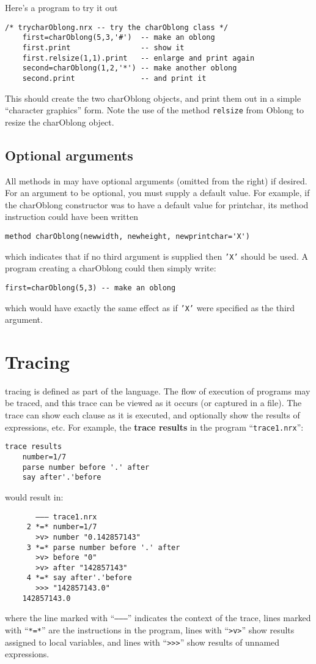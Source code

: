 Here’s a program to try it out
\begin{lstlisting}[label=trycharoblong,caption=tryCharOblong.nrx]
    /* trycharOblong.nrx -- try the charOblong class */
    first=charOblong(5,3,'#')  -- make an oblong
    first.print                -- show it
    first.relsize(1,1).print   -- enlarge and print again
    second=charOblong(1,2,'*') -- make another oblong
    second.print               -- and print it
\end{lstlisting}
This should create the two charOblong objects, and print them out in a simple “character graphics” form. Note the use of the method \texttt{relsize} from Oblong to resize the charOblong object.
\subsection{Optional arguments}
All methods in \nr{} may have optional arguments (omitted from the
right) if desired. For an argument to be optional, you must supply a
default value. For example, if the charOblong constructor was to have
a default value for printchar, its method instruction could have been
written
\begin{lstlisting}[label=default,caption=Default value X]
method charOblong(newwidth, newheight, newprintchar='X')
\end{lstlisting}
which indicates that if no third argument is supplied then \texttt{'X'} should be used. A program
creating a charOblong could then simply write:
\begin{lstlisting}[label=default,caption=Default value]
first=charOblong(5,3) -- make an oblong
\end{lstlisting}
which would have exactly the same effect as if \texttt{'X'} were specified as
the third argument.


\section{Tracing}
\nr{} tracing is defined as part of the language. The flow of
execution of programs may be traced, and this trace can be viewed as
it occurs (or captured in a file). The trace can show each clause as
it is executed, and optionally show the results of expressions,
etc. For example, the \textbf{trace results} in the program “\texttt{trace1.nrx}”:
\begin{lstlisting}[label=trace,caption=Trace]
    trace results
    number=1/7
    parse number before '.' after
    say after'.'before
\end{lstlisting}
would result in:
\begin{verbatim}
       ––– trace1.nrx
     2 *=* number=1/7
       >v> number "0.142857143"
     3 *=* parse number before '.' after
       >v> before "0"
       >v> after "142857143"
     4 *=* say after'.'before
       >>> "142857143.0"
    142857143.0
\end{verbatim}
where the line marked with “\texttt{–––}” indicates the context of the trace, lines marked with “\texttt{*=*}” are the instructions in the program, lines with “\texttt{>v>}” show results assigned to local variables, and lines with “\texttt{>>>}” show results of unnamed expressions.

